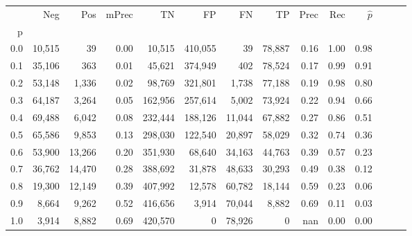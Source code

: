 \begin{tabular}{rrrrrrrrrrrrrr}
\toprule
{} &     Neg &     Pos & mPrec &       TN &       FP &      FN &      TP &  Prec &   Rec & $\hat{p}$ \\
p   &         &         &       &          &          &         &         &       &       &           \\
\midrule
0.0 &  10,515 &      39 &  0.00 &   10,515 &  410,055 &      39 &  78,887 &  0.16 &  1.00 &      0.98 \\
0.1 &  35,106 &     363 &  0.01 &   45,621 &  374,949 &     402 &  78,524 &  0.17 &  0.99 &      0.91 \\
0.2 &  53,148 &   1,336 &  0.02 &   98,769 &  321,801 &   1,738 &  77,188 &  0.19 &  0.98 &      0.80 \\
0.3 &  64,187 &   3,264 &  0.05 &  162,956 &  257,614 &   5,002 &  73,924 &  0.22 &  0.94 &      0.66 \\
0.4 &  69,488 &   6,042 &  0.08 &  232,444 &  188,126 &  11,044 &  67,882 &  0.27 &  0.86 &      0.51 \\
0.5 &  65,586 &   9,853 &  0.13 &  298,030 &  122,540 &  20,897 &  58,029 &  0.32 &  0.74 &      0.36 \\
0.6 &  53,900 &  13,266 &  0.20 &  351,930 &   68,640 &  34,163 &  44,763 &  0.39 &  0.57 &      0.23 \\
0.7 &  36,762 &  14,470 &  0.28 &  388,692 &   31,878 &  48,633 &  30,293 &  0.49 &  0.38 &      0.12 \\
0.8 &  19,300 &  12,149 &  0.39 &  407,992 &   12,578 &  60,782 &  18,144 &  0.59 &  0.23 &      0.06 \\
0.9 &   8,664 &   9,262 &  0.52 &  416,656 &    3,914 &  70,044 &   8,882 &  0.69 &  0.11 &      0.03 \\
1.0 &   3,914 &   8,882 &  0.69 &  420,570 &        0 &  78,926 &       0 &   nan &  0.00 &      0.00 \\
\bottomrule
\end{tabular}
